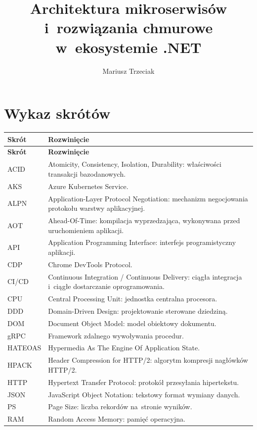 \documentclass{PracaDyplomowa}
\author{Mariusz Trzeciak}
\title{Architektura mikroserwisów i~rozwiązania chmurowe w~ekosystemie .NET}
\begin{document}
\frontpage
\tableofcontents

\chapter*{Wykaz skrótów}

{\footnotesize
\renewcommand{\arraystretch}{1.2}
\begin{longtable}{|p{2.8cm}|p{10.8cm}|}
\hline
\textbf{Skrót} & \textbf{Rozwinięcie} \\
\hline
\endfirsthead
\hline
\textbf{Skrót} & \textbf{Rozwinięcie} \\
\hline
\endhead
ACID & Atomicity, Consistency, Isolation, Durability: właściwości transakcji bazodanowych. \\
\hline
AKS & Azure Kubernetes Service. \\
\hline
ALPN & Application-Layer Protocol Negotiation: mechanizm negocjowania protokołu warstwy aplikacyjnej. \\
\hline
AOT & Ahead-Of-Time: kompilacja wyprzedzająca, wykonywana przed uruchomieniem aplikacji. \\
\hline
API & Application Programming Interface: interfejs programistyczny aplikacji. \\
\hline
CDP & Chrome DevTools Protocol. \\
\hline
CI/CD & Continuous Integration / Continuous Delivery: ciągła integracja i~ciągłe dostarczanie oprogramowania. \\
\hline
CPU & Central Processing Unit: jednostka centralna procesora. \\
\hline
DDD & Domain-Driven Design: projektowanie sterowane dziedziną. \\
\hline
DOM & Document Object Model: model obiektowy dokumentu. \\
\hline
gRPC & Framework zdalnego wywoływania procedur. \\
\hline
HATEOAS & Hypermedia As The Engine Of Application State. \\
\hline
HPACK & Header Compression for HTTP/2: algorytm kompresji nagłówków HTTP/2. \\
\hline
HTTP & Hypertext Transfer Protocol: protokół przesyłania hipertekstu. \\
\hline
JSON & JavaScript Object Notation: tekstowy format wymiany danych. \\
\hline
PS & Page Size: liczba rekordów na~stronie wyników. \\
\hline
RAM & Random Access Memory: pamięć operacyjna. \\

\end{longtable}}
\end{document}
